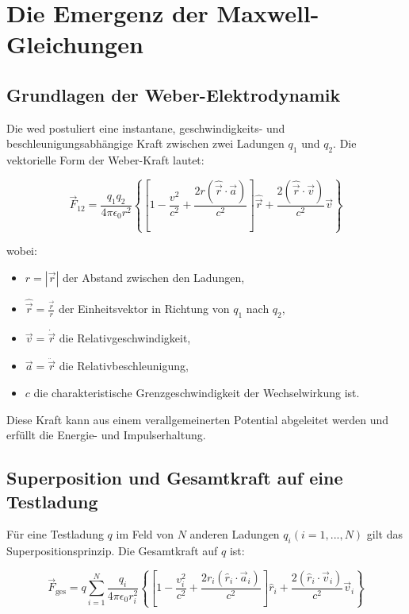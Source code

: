 \chapter{Die Emergenz der Maxwell-Gleichungen}
\section{Grundlagen der Weber-Elektrodynamik}
\label{sec:grundlagen}
Die \gls{wed} postuliert eine instantane, geschwindigkeits- und beschleunigungsabhängige Kraft zwischen zwei Ladungen $q_1$ und $q_2$. Die vektorielle Form der Weber-Kraft lautet:

\begin{equation}
    \vec{F}_{12} = \frac{q_1 q_2}{4\pi\epsilon_0 r^2} \left\{ \left[ 1 - \frac{v^2}{c^2} + \frac{2r(\hat{\vec{r}}\cdot\vec{a})}{c^2} \right] \hat{\vec{r}} + \frac{2(\hat{\vec{r}}\cdot\vec{v})}{c^2} \vec{v} \right\}
\end{equation}

wobei:

\begin{itemize}
    \item $r = \left| \vec{r} \right|$ der Abstand zwischen den Ladungen,
    \item $\hat{\vec{r}} = \frac{\vec{r}}{r}$ der Einheitsvektor in Richtung von $q_1$ nach $q_2$,
    \item $\vec{v} = \dot{\vec{r}}$ die Relativgeschwindigkeit,
    \item $\vec{a} = \ddot{\vec{r}}$ die Relativbeschleunigung,
    \item $c$ die charakteristische Grenzgeschwindigkeit der Wechselwirkung ist.
\end{itemize}

Diese Kraft kann aus einem verallgemeinerten Potential abgeleitet werden und erfüllt die Energie- und Impulserhaltung.

\section{Superposition und Gesamtkraft auf eine Testladung}
Für eine Testladung $q$ im Feld von $N$ anderen Ladungen $q_i (i = 1,...,N)$ gilt das Superpositionsprinzip. Die Gesamtkraft auf $q$ ist:

\begin{equation}
    \label{eq:gesamtkraft}
    \vec{F}_{\text{ges}} = q \sum_{i=1}^N \frac{q_i}{4\pi\epsilon_0 r_i^2} \left\{ \left[ 1 - \frac{v_i^2}{c^2} + \frac{2r_i(\hat{r}_i\cdot\vec{a}_i)}{c^2} \right] \hat{r}_i + \frac{2(\hat{r}_i\cdot\vec{v}_i)}{c^2} \vec{v}_i \right\}
\end{equation}

